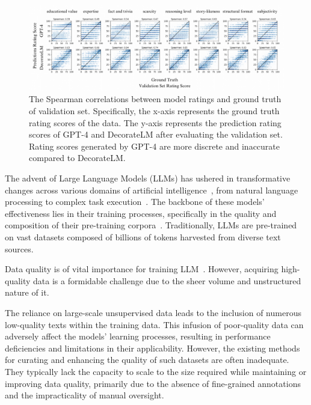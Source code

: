\documentclass[11pt]{article}
\begin{document}
\begin{figure}[t]
    \centering
    \includegraphics[width=\textwidth]{figs/spearmanrating.pdf}
    \caption{The Spearman correlations between model ratings and ground truth of validation set. Specifically, the x-axis represents the ground truth rating scores of the data. The y-axis represents the prediction rating scores of GPT-4 and DecorateLM after evaluating the validation set. Rating scores generated by GPT-4 are more discrete and inaccurate compared to DecorateLM.}
    \label{fig:spearmanrating}
\end{figure}

The advent of Large Language Models (LLMs) has ushered in transformative changes across various domains of artificial intelligence~\citep{brown2020language,chowdhery2023palm}, from natural language processing to complex task execution~\citep{qian2023communicative}. The backbone of these models' effectiveness lies in their training processes, specifically in the quality and composition of their pre-training corpora~\citep{penedo2023refinedweb,le2023bloom}. Traditionally, LLMs are pre-trained on vast datasets composed of billions of tokens harvested from diverse text sources.

Data quality is of vital importance for training LLM~\citep{zhou2024lima}. However, acquiring high-quality data is a formidable challenge due to the sheer volume and unstructured nature of it.

The reliance on large-scale unsupervised data leads to the inclusion of numerous low-quality texts within the training data. This infusion of poor-quality data can adversely affect the models' learning processes, resulting in performance deficiencies and limitations in their applicability. However, the existing methods for curating and enhancing the quality of such datasets are often inadequate. They typically lack the capacity to scale to the size required while maintaining or improving data quality, primarily due to the absence of fine-grained annotations and the impracticality of manual oversight.
\end{document}
